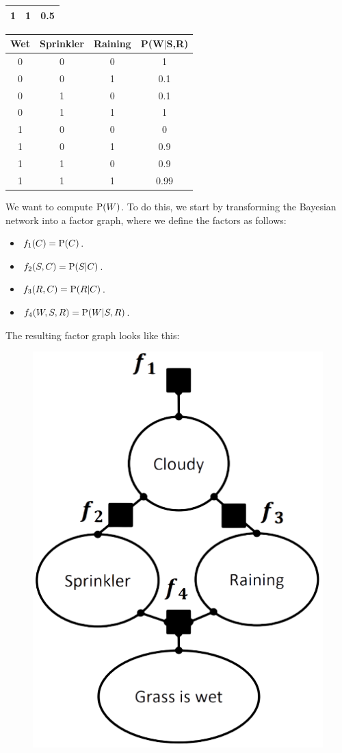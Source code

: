 \documentclass[12pt, a4paper]{report}
\begin{document}
\begin{example}
\begin{table}[H]
\begin{tabular}{ccc}
            1       & 1      & 0.5    \\ \hline
            \end{tabular}
        \end{table}
        \begin{table}[H]
            \centering
            \begin{tabular}{cccc}
            \hline
            \textbf{Wet} & \textbf{Sprinkler} & \textbf{Raining} & \textbf{P(W$|$S,R)} \\ \hline
            0            & 0                  & 0                & 1                   \\
            0            & 0                  & 1                & 0.1                 \\
            0            & 1                  & 0                & 0.1                 \\
            0            & 1                  & 1                & 1                   \\
            1            & 0                  & 0                & 0                   \\
            1            & 0                  & 1                & 0.9                 \\
            1            & 1                  & 0                & 0.9                 \\
            1            & 1                  & 1                & 0.99                \\ \hline
            \end{tabular}
        \end{table}
        We want to compute $\textnormal{P}(W)$. To do this, we start by transforming the Bayesian network into a factor graph, where we define the factors as follows:
        \begin{itemize}
            \item $f_1(C)=\textnormal{P}(C)$.
            \item $f_2(S,C)=\textnormal{P}(S|C)$.
            \item $f_3(R,C)=\textnormal{P}(R|C)$.
            \item $f_4(W,S,R)=\textnormal{P}(W|S,R)$.
        \end{itemize}
        The resulting factor graph looks like this:
        \begin{figure}[H]
            \centering
            \includegraphics[width=0.25\linewidth]{images/sprinklerfg.png}

\end{figure}
\end{example}
\end{document}
